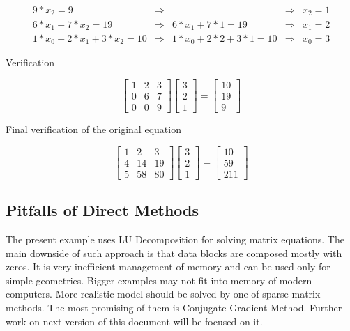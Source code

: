 \begin{equation}
\begin{array}{llllll}
	9 * x_2 = 9 & \Rightarrow & & \Rightarrow & x_2 = 1 \\
	6 * x_1 + 7 * x_2 = 19 & \Rightarrow & 6 * x_1 + 7 * 1 = 19 & \Rightarrow & x_1 = 2 \\
	1 * x_0 + 2 * x_1 + 3 * x_2 = 10 & \Rightarrow & 1 * x_0 + 2 * 2 + 3 * 1 = 10 & \Rightarrow & x_0 = 3
\end{array}
\end{equation}

Verification

\begin{equation}
\begin{bmatrix}
	1 & 2 & 3 \\
	0 & 6 & 7 \\
	0 & 0 & 9
\end{bmatrix}
\begin{bmatrix}
	3 \\
	2 \\
	1
\end{bmatrix}
=
\begin{bmatrix}
	10 \\
	19 \\
	9
\end{bmatrix}
\end{equation}

Final verification of the original equation

\begin{equation}
\begin{bmatrix}
	1 & 2 & 3 \\
	4 & 14 & 19 \\
	5 & 58 & 80
\end{bmatrix}
\begin{bmatrix}
	3 \\
	2 \\
	1
\end{bmatrix}
=
\begin{bmatrix}
	10 \\
	59 \\
	211
\end{bmatrix}
\end{equation}

\subsection{Pitfalls of Direct Methods}

The present example uses LU Decomposition for solving matrix equations. The main downside of such approach is that data blocks are composed mostly with zeros. It is very inefficient management of memory and can be used only for simple geometries. Bigger examples may not fit into memory of modern computers.
More realistic model should be solved by one of sparse matrix methods. The most promising of them is Conjugate Gradient Method. Further work on next version of this document will be focused on it.

